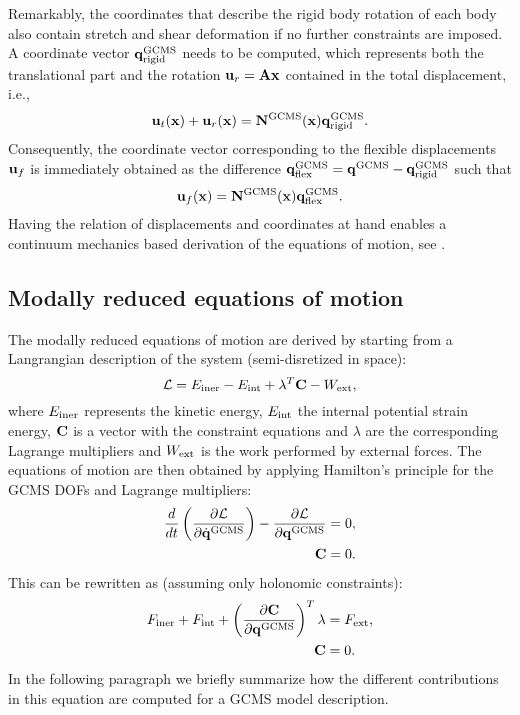 Remarkably, the coordinates that describe the rigid body rotation of each body also contain stretch and shear deformation if no further constraints are imposed.
A coordinate vector $\mathbf q_{\rm rigid}^{\rm GCMS}$ needs to be computed, which represents both the translational part and the rotation $\mathbf u_{r} = \mathbf A \mathbf x$ contained in the total displacement, i.e.,
\begin{equation}
\mathbf u_{t}(\mathbf x) + \mathbf u_{r}(\mathbf x) = \mathbf N^{\rm GCMS}(\mathbf x) \mathbf q_{\rm rigid}^{\rm GCMS} .
\end{equation}
Consequently, the coordinate vector corresponding to the flexible displacements $\mathbf u_{f}$ is immediately obtained as the difference $\mathbf q_{\rm flex}^{\rm GCMS} = \mathbf q^{\rm GCMS} - \mathbf q_{\rm rigid}^{\rm GCMS}$ such that
\begin{equation}
\mathbf u_{f}(\mathbf x) = \mathbf N^{\rm GCMS} (\mathbf x) \mathbf q_{\rm flex}^{\rm GCMS} .
\end{equation}
Having the relation of displacements and coordinates at hand enables a continuum mechanics based derivation of the equations of motion, see \cite{gerstmayr2006, pechstein2013}.

%
\subsection{Modally reduced equations of motion}

The modally reduced equations of motion are derived by starting from a Langrangian description of the system (semi-disretized in space):
\begin{equation}
\mathcal{L} = E_{\mathrm{iner}} - E_{\mathrm{int}} + \lambda^T\mathbf C - W_{\mathrm{ext}},
\end{equation}
where $E_{\mathrm{iner}}$ represents the kinetic energy, $E_{\mathrm{int}}$ the internal potential strain energy, $\mathbf C$ is a vector with the constraint equations and $\lambda$ are the corresponding Lagrange multipliers and $W_{\mathrm{ext}}$ is the work performed by external forces. The equations of motion are then obtained by applying Hamilton's principle for the GCMS DOFs and Lagrange multipliers:
\begin{eqnarray}
\frac{d}{dt}\left(\frac{\partial\mathcal{L}}{\partial \dot{\mathbf q}^{\rm GCMS}}\right) - \frac{\partial\mathcal{L}}{\partial \mathbf q^{\rm GCMS}} &= 0, \\
\mathbf C & = 0. 
\end{eqnarray}
This can be rewritten as (assuming only holonomic constraints):
\begin{eqnarray}
F_{\mathrm{iner}} + F_{\mathrm{int}} + \left(\frac{\partial \mathbf C}{\partial \mathbf q^{\rm GCMS}}\right)^T\lambda &= F_{\mathrm{ext}}, \\
\mathbf C & = 0. 
\end{eqnarray}
In the following paragraph we briefly summarize how the different contributions in this equation are computed for a GCMS model description.

